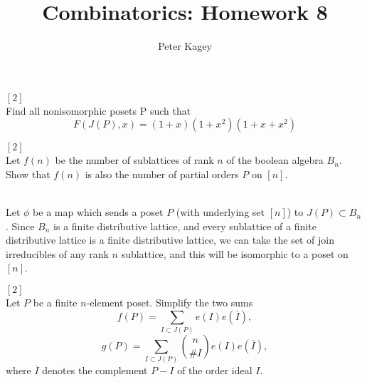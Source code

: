 \documentclass{article}
\newenvironment{problem}[2][Problem]{\begin{trivlist}
\item[\hskip \labelsep {\bfseries #1}\hskip \labelsep {\bfseries #2.}]}{\end{trivlist}}
\newenvironment{solution}[1][Solution.]{\begin{trivlist}
\item[\hskip \labelsep {\bfseries #1}]}{\end{trivlist}}
\begin{document}
\title{Combinatorics: Homework 8}
\author{Peter Kagey}

\maketitle

\begin{problem}{34} $[2]$ \\
  Find all nonisomorphic posets P such that \[
    F(J(P), x) = (1 + x)(1 + x^2)(1 + x + x^2)
  \]
\end{problem}

\begin{solution} \text{}
\end{solution}
\pagebreak
\begin{problem}{46 a} $[2]$ \\
  Let $f(n)$ be the number of sublattices of rank $n$ of the boolean algebra
  $B_n$. Show that $f(n)$ is also the number of partial orders $P$ on $[n]$.
\end{problem}

\begin{solution} \text{} \\
  Let $\phi$ be a map which sends a poset $P$ (with underlying set $[n]$) to
  $J(P) \subset B_n$.
  Since $B_n$ is a finite distributive lattice, and every sublattice of a
  finite distributive lattice is a finite distributive lattice, we can
  take the set of join irreducibles of any rank $n$ sublattice, and this will
  be isomorphic to a poset on $[n]$.
\end{solution}
\pagebreak
\begin{problem}{53} $[2]$ \\
  Let $P$ be a finite $n$-element poset. Simplify the two sums \[
    f(P) = \sum_{I \subset J(P)} e(I)e(\overline I),
  \] \[
    g(P) = \sum_{I \subset J(P)} \binom{n}{\#I} e(I)e(\overline I),
  \] where $\overline I$ denotes the complement $P - I$ of the order ideal $I$.
\end{problem}
\end{document}
